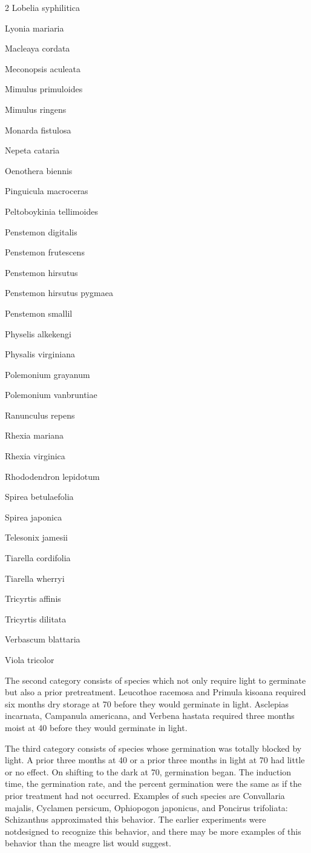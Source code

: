 \begin{multicols}{2}
Lobelia syphilitica

Lyonia mariaria

Macleaya cordata

Meconopsis aculeata

Mimulus primuloides

Mimulus ringens

Monarda fistulosa

Nepeta cataria

Oenothera biennis

Pinguicula macroceras

Peltoboykinia tellimoides

Penstemon digitalis

Penstemon frutescens

Penstemon hirsutus

Penstemon hirsutus pygmaea

Penstemon smallil

Physelis alkekengi

Physalis virginiana

Polemonium grayanum

Polemonium vanbruntiae

Ranunculus repens

Rhexia mariana

Rhexia virginica

Rhododendron lepidotum

Spirea betulaefolia

Spirea japonica

Telesonix jamesii

Tiarella cordifolia

Tiarella wherryi

Tricyrtis affinis

Tricyrtis dilitata

Verbascum blattaria

Viola tricolor
\end{multicols}

The second category consists of species which not only require light to
germinate but also a prior pretreatment. Leucothoe racemosa and Primula kisoana
required six months dry storage at 70 before they would germinate in light. Asclepias
incarnata, Campanula americana, and Verbena hastata required three months moist
at 40 before they would germinate in light.

The third category consists of species whose germination was totally blocked
by light. A prior three months at 40 or a prior three months in light at 70 had little or no
effect. On shifting to the dark at 70, germination began. The induction time, the
germination rate, and the percent germination were the same as if the prior treatment
had not occurred. Examples of such species are Convallaria majalis, Cyclamen
persicum, Ophiopogon japonicus, and Poncirus trifoliata: Schizanthus approximated
this behavior. The earlier experiments were notdesigned to recognize this behavior,
and there may be more examples of this behavior than the meagre list would suggest.

